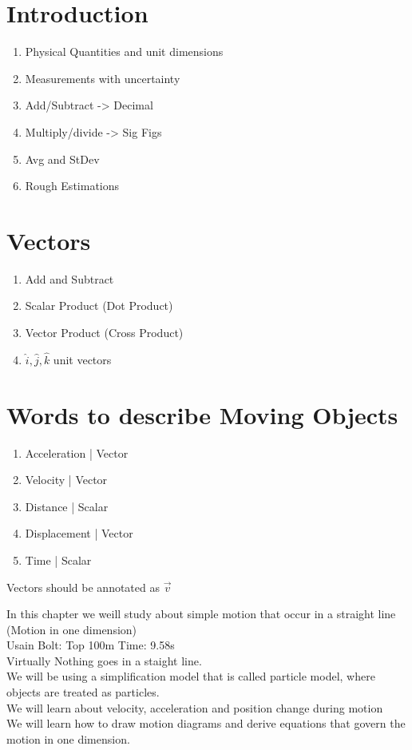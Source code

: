 \documentclass[]{article}
\date{Monday, January 30\textsuperscript(th), 2023}
\title{\docTitle}
\author{\docAuthor}
\begin{document}
\maketitle

\section{Introduction}
\begin{enumerate}
	\item Physical Quantities and unit dimensions
	\item Measurements with uncertainty
	\item Add/Subtract -> Decimal
	\item Multiply/divide -> Sig Figs
	\item Avg and StDev
	\item Rough Estimations
\end{enumerate}

\section{Vectors}
\begin{enumerate}
	\item Add and Subtract
	\item Scalar Product (Dot Product)
	\item Vector Product (Cross Product)
	\item $\hat{i}, \hat{j}, \hat{k}$ unit vectors
\end{enumerate}


\section{Words to describe Moving Objects}
\begin{enumerate}
	\item Acceleration | Vector
	\item Velocity | Vector
	\item Distance | Scalar
	\item Displacement | Vector
	\item Time | Scalar
\end{enumerate}

Vectors should be annotated as $\vec{v}$

In this chapter we weill study about simple motion that occur in a straight line (Motion in one dimension)\\
Usain Bolt: Top 100m Time: 9.58s\\
Virtually Nothing goes in a staight line.\\
We will be using a simplification model that is called particle model, where objects are treated as particles.\\
We will learn about velocity, acceleration and position change during motion\\
We will learn how to draw motion diagrams and derive equations that govern the motion in one dimension.
\end{document}
